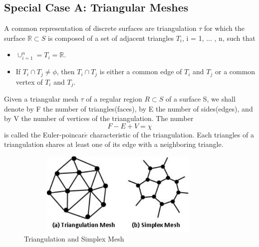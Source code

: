 \documentclass{InsightArticle}
\begin{document}
\subsection{Special Case A: Triangular Meshes}
A common representation of discrete surfaces are triangulation $\tau$ for which the surface $\mathbb{R} \subset S$ is composed of a set of adjacent triangles $T_i$, i = 1, ... , n, such that 
\begin{itemize}
	\item $\cup_{i=1}^n = T_i = \mathbb{R}$.
	\item If $T_i \cap T_j \neq \phi$, then $T_i \cap T_j$ is either a common edge of $T_i$ and $T_j$ or a common vertex of $T_i$ and $T_j$. 
\end{itemize}
Given a triangular mesh $\tau$ of a regular region $R \subset S$ of a surface S, we shall denote by F the number of triangles(faces), by E the number of sides(edges), and by V the number of vertices of the triangulation. The number 
\begin{equation}
F - E + V = \chi
\end{equation}
is called the Euler-poincar$\acute{e}$ characteristic of the triangulation.
Each triangles of a triangulation shares at least one of its edge with a neighboring triangle.
\begin{figure}[!t]
	\centering
	\includegraphics[width=100mm, height=40mm]{TriangulationSimplexMesh}
	\caption{Triangulation and Simplex Mesh}
	\label{fig:triangulationSimplexMesh}
\end{figure}
\end{document}

